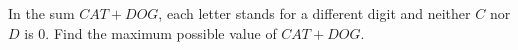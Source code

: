 In the sum $CAT+DOG$, each letter stands for a different digit and neither $C$ nor $D$ is $0$. Find the maximum possible value of $CAT+DOG$.
